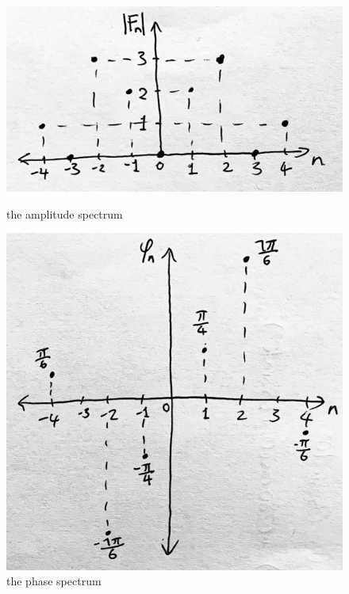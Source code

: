 \documentclass[12pt]{article}
\begin{document}
\begin{figure}[h!]
    \begin{minipage}[c]{0.47\linewidth}
        \centering
        \includegraphics[width=1\linewidth]{fourier_series_two_side_spectrum_example1}
        \caption{the amplitude spectrum}
        \label{fig:fourier_series_two_side_spectrum_example1}
    \end{minipage}\hfill
    \begin{minipage}[c]{0.47\linewidth}
        \centering
        \includegraphics[width=1\linewidth]{fourier_series_two_side_spectrum_example2}
        \caption{the phase spectrum}
        \label{fig:fourier_series_two_side_spectrum_example2}
    \end{minipage}
\end{figure}
\end{document}
